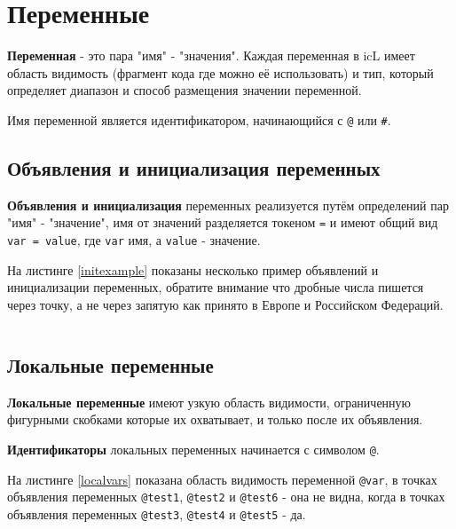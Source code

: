 \section{Переменные}

\textbf{Переменная} - это пара "имя" - "значения". Каждая переменная в icL имеет область видимость (фрагмент кода где можно её использовать) и тип, который определяет диапазон и способ размещения значении переменной.

Имя переменной является идентификатором, начинающийся с \texttt{@} или {\color{blue2}\texttt{#}}.

\subsection{Объявления и инициализация переменных}

\textbf{Объявления и инициализация} переменных реализуется путём определений пар "имя" - "значение", имя от значений разделяется токеном \texttt{=} и имеют общий вид \texttt{var = value}, где \texttt{var} имя, а \texttt{value} - значение.

На листинге \ref{initexample} показаны несколько пример объявлений и инициализации переменных, обратите внимание что дробные числа пишется через точку, а не через запятую как принято в Европе и Российском Федераций.

\begin{sourcecode}
	\label{initexample}
    \inputminted[linenos]{icl}{../sources/initexample.icL}
\end{sourcecode}

\subsection{Локальные переменные}

\textbf{Локальные переменные} имеют узкую область видимости, ограниченную фигурными скобками которые их охватывает, и только после их объявления.

{\bf Идентификаторы} локальных переменных начинается с символом \texttt{@}.

На листинге \ref{localvars} показана область видимость переменной \texttt{@var}, в точках объявления переменных \texttt{@test1}, \texttt{@test2} и \texttt{@test6} - она не видна, когда в точках объявления переменных \texttt{@test3}, \texttt{@test4} и \texttt{@test5} - да.
\begin{sourcecode}
	\label{localvars}
    \inputminted[linenos]{icl}{../sources/localvars.icL}
\end{sourcecode}

